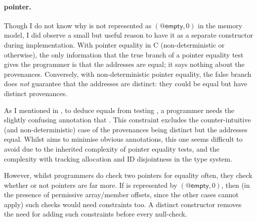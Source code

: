 \paragraph{ pointer.}%
Though I do not know why  is not represented as
$(@\mathsf{empty}, 0)$ in the memory model, I did observe a
small but useful reason to have it as a separate constructor during
implementation. With pointer equality in C (non-deterministic or otherwise),
the only information that the true branch of a pointer equality test gives the
programmer is that the addresses are equal; it says nothing about the
provenances. Conversely, with non-deterministic pointer equality, the false
branch does \emph{not} guarantee that the addresses are distinct: they could be
equal but have distinct provenances.

As I mentioned in , to deduce  equals
 from testing , a programmer needs the slightly
confusing annotation that . %
This constraint excludes the counter-intuitive (and non-deterministic) case of
the provenances being distinct but the addresses equal. Whilst  aims to minimise
obvious annotations, this one seems difficult to avoid due to the
inherited complexity of pointer equality tests, and the complexity with
tracking allocation and ID disjointness in the type system.

However, whilst programmers do check two pointers for equality often, they
check whether or not pointers are  far more. If  is
represented by $(@\mathsf{empty}, 0)$, then (in the presence of permissive
array/member offsets, since the other cases cannot apply) such checks would
need constraints too. A distinct  constructor removes the need
for adding such constraints before every null-check.

